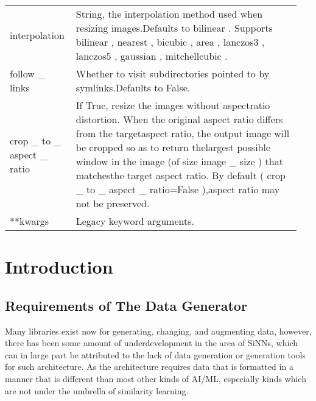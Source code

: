 \documentclass[
	letterpaper, %
	10pt, %
	unnumberedsections, %
	twoside, %
]{LTJournalArticle}
\begin{document}
\begin{table*}[hbt!]
\begin{tabular}{L{0.2\linewidth} L{0.75\linewidth}}
        interpolation                 & String, the interpolation method used when resizing images.Defaults to bilinear . Supports bilinear , nearest , bicubic , area , lanczos3 , lanczos5 , gaussian , mitchellcubic .                                                                                                                                                                                                                                                        \\
        follow \_ links               & Whether to visit subdirectories pointed to by symlinks.Defaults to False.                                                                                                                                                                                                                                                                                                                                                                \\
        crop \_ to \_ aspect \_ ratio & If True, resize the images without aspectratio distortion. When the original aspect ratio differs from the targetaspect ratio, the output image will be cropped so as to return thelargest possible window in the image (of size image \_ size ) that matchesthe target aspect ratio. By default ( crop \_ to \_ aspect \_ ratio=False ),aspect ratio may not be preserved.                                                              \\
        **kwargs                      & Legacy keyword arguments.                                                                                                                                                                                                                                                                                                                                                                                                                \\
		\bottomrule
	\end{tabular}
    \label{tab:tensorflow_image_dataset_from_directory}
\end{table*}

\section{Introduction}

\subsection{Requirements of The Data Generator}
Many libraries exist now for generating, changing, and augmenting data, however, there has been some amount of underdevelopment in the area of SiNNs, which can in large part be attributed to the lack of data generation or generation tools for such architecture. As the architecture requires data that is formatted in a manner that is different than most other kinds of AI/ML, especially kinds which are not under the umbrella of similarity learning.
\end{document}
